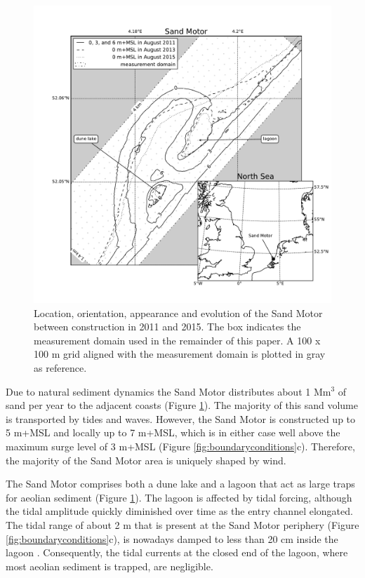 \begin{figure}
  \centering
  \includegraphics[width=\columnwidth]{../Figures/location_and_evolution}
  \caption{Location, orientation, appearance and evolution of the Sand
    Motor between construction in 2011 and 2015. The box indicates the
    measurement domain used in the remainder of this paper. A 100 x
    100 m grid aligned with the measurement domain is plotted in gray
    as reference.}
  \label{fig:fieldsite3}
\end{figure}

Due to natural sediment dynamics the Sand Motor distributes about 1
$\mathrm{Mm^3}$ of sand per year to the adjacent coasts (Figure
\ref{fig:fieldsite3}). The majority of this sand volume is transported
by tides and waves. However, the Sand Motor is constructed up to 5
m+MSL and locally up to 7 m+MSL, which is in either case well above
the maximum surge level of 3 m+MSL (Figure
\ref{fig:boundaryconditions}c). Therefore, the majority of the Sand
Motor area is uniquely shaped by wind.

The Sand Motor comprises both a dune lake and a lagoon that act as
large traps for aeolian sediment (Figure \ref{fig:fieldsite3}). The
lagoon is affected by tidal forcing, although the tidal amplitude
quickly diminished over time as the entry channel elongated. The tidal
range of about 2 m that is present at the Sand Motor periphery (Figure
\ref{fig:boundaryconditions}c), is nowadays damped to less than 20 cm
inside the lagoon \citep{deVries2015}. Consequently, the tidal
currents at the closed end of the lagoon, where most aeolian sediment
is trapped, are negligible.

